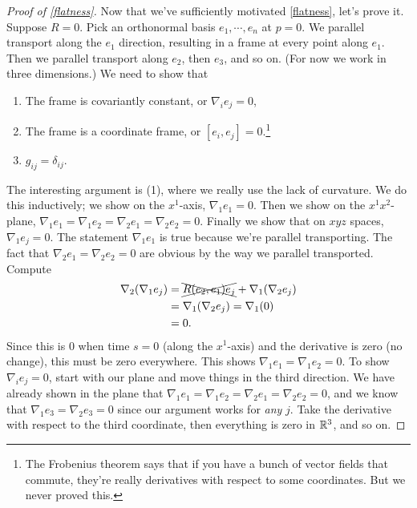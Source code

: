 \begin{proof}[Proof of \cref{flatness}]
    Now that we've sufficiently motivated \cref{flatness}, let's prove it. Suppose $R=0$. Pick an orthonormal basis $e_1,\cdots ,e_n $ at $p=0$. We parallel transport along the $e_1$ direction, resulting in a frame at every point along $e_1$. Then we parallel transport along $e_2$, then $e_3$, and so on. (For now we work in three dimensions.) We need to show that
    \begin{enumerate}[label=(\arabic*)]
    \setlength\itemsep{-.2em}
        \item The frame is covariantly constant, or $\nabla_i e_j =0$,
        \item The frame is a coordinate frame, or $[e_i ,e_j ]=0$.\footnote{The Frobenius theorem says that if you have a bunch of vector fields that commute, they're really derivatives with respect to some coordinates. But we never proved this.}
        \item $g_{ij}=\delta _{ij}$.
    \end{enumerate}The interesting argument is (1), where we really use the lack of curvature. We do this inductively; we show on the $x^1$-axis, $\nabla_1e_1=0$. Then we show on the $x^1x^2$-plane, $\nabla_1e_1=\nabla_1e_2=\nabla_2e_1=\nabla_2e_2=0$. Finally we show that on $xyz$ spaces, $\nabla_1e_j =0$. The statement $\nabla_1e_1$ is true because we're parallel transporting. The fact that $\nabla_2e_1=\nabla_2e_2=0$ are obvious by the way we parallel transported. Compute
    \begin{align*}
        \nabla_2(\nabla_1e_j )&=\xcancel{ R(e_2,e_1)e_j }+\nabla_1(\nabla_2e_j )\\
                              &=\nabla_1(\nabla_2e_j )=\nabla_1(0)\\
                              &=0.
    \end{align*}Since this is $0$ when time $s=0$ (along the $x^1$-axis) and the derivative is zero (no change), this must be zero everywhere. This shows $\nabla_1e_1=\nabla_1e_2=0$. To show $\nabla_i e_j =0$, start with our plane and move things in the third direction. We have already shown in the plane that $\nabla_1e_1=\nabla_1e_2=\nabla_2e_1=\nabla_2e_2=0$, and we know that $\nabla_1e_3=\nabla_2e_3=0$ since our argument works for \emph{any} $j$. Take the derivative with respect to the third coordinate, then everything is zero in $\mathbb{R}^3$, and so on.
\end{proof}

